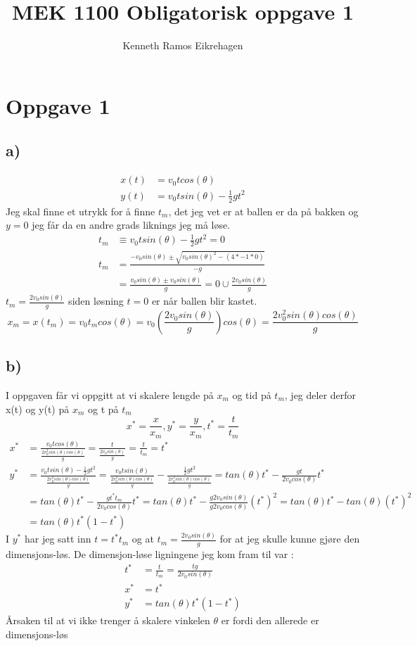 \documentclass[a4paper,12pt,norsk]{article}
\title{MEK 1100 Obligatorisk oppgave 1}
\author{Kenneth Ramos Eikrehagen}
\begin{document}
\maketitle
\tableofcontents
\section{Oppgave 1}
\subsection{a)}
\begin{align*}
x(t) &= v_0tcos(\theta)\\
y(t) &= v_0tsin(\theta) - \frac{1}{2}gt^2
\end{align*}
Jeg skal finne et utrykk for å finne $t_m$, det jeg vet er at ballen er da på bakken og $y = 0$ jeg får da en andre grads liknings jeg må løse.
\begin{align*}
t_m &\equiv v_0tsin(\theta) - \frac{1}{2}gt^2 = 0 \\
t_m & = \frac{-v_0sin(\theta)\pm \sqrt{v_0sin(\theta)^2 - (4*-1*0)}}{-g}\\
& = \frac{v_0sin(\theta) \pm v_0sin(\theta)}{g} = 0 \cup  \frac{2v_0sin(\theta)}{g}
\end{align*}
$t_m = \frac{2v_0sin(\theta)}{g}$ siden løsning $t = 0$ er når ballen blir kastet. 
$$x_m = x(t_m) = v_0t_mcos(\theta) = v_0(\frac{2v_0sin(\theta)}{g})cos(\theta) = \frac{2v_0^2sin(\theta)cos(\theta)}{g}$$

\subsection{b)}
I oppgaven får vi oppgitt at vi skalere lengde på $x_m$ og tid på $t_m$, jeg deler derfor x(t) og y(t) på $x_m$ og t på $t_m$
$$x^* = \frac{x}{x_m}, y^* = \frac{y}{x_m}, t^* = \frac{t}{t_m}$$
\begin{align*}
x^* &= \frac{v_0tcos(\theta)}{\frac{2v_0^2sin(\theta)cos(\theta)}{g}} = \frac{t}{\frac{2v_0sin(\theta)}{g}}= \frac{t}{t_m} = t^*\\
y^* &= \frac{v_0tsin(\theta) - \frac{1}{2}gt^2}{\frac{2v_0^2sin(\theta)cos(\theta)}{g}}  = \frac{v_0tsin(\theta)}{\frac{2v_0^2sin(\theta)cos(\theta)}{g}} - \frac{\frac{1}{2}gt^2}{\frac{2v_0^2sin(\theta)cos(\theta)}{g}} = tan(\theta)t^* - \frac{gt}{2v_0cos(\theta)}t^*\\
 &= tan(\theta)t^* - \frac{gt^*t_m}{2v_0cos(\theta)}t^* = tan(\theta)t^* - \frac{g2v_0sin(\theta)}{g2v_0cos(\theta)}(t^*)^2 = tan(\theta)t^* - tan(\theta)(t^*)^2 \\
 &= tan(\theta)t^*(1-t^*)
\end{align*}
I $y^*$ har jeg satt inn $ t= t^*t_m$ og at $t_m = \frac{2v_0sin(\theta)}{g}$ for at jeg skulle kunne gjøre den dimensjons-løs. De dimensjon-løse ligningene jeg kom fram til var : 
\begin{align*}
t^* &= \frac{t}{t_m} = \frac{tg}{2v_0sin(\theta)}\\
x^* &= t^*\\
y^* &= tan(\theta)t^*(1-t^*)
\end{align*}
Årsaken til at vi ikke trenger å skalere vinkelen $\theta$ er fordi den allerede er dimensjons-løs
\end{document}
